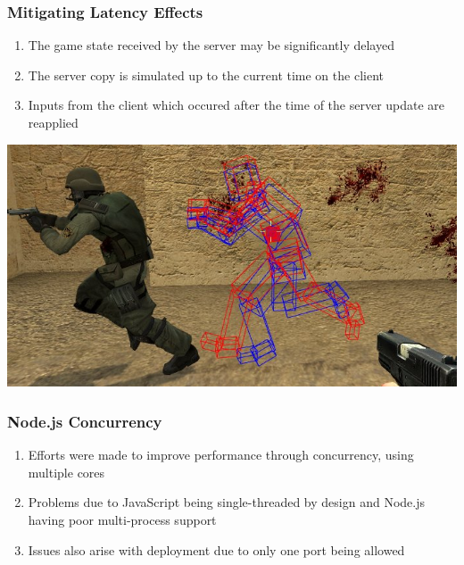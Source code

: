 \documentclass{beamer}
\begin{document}
\begin{frame}
\frametitle{Mitigating Latency Effects}
\begin{enumerate}
  \item The game state received by the server may be significantly delayed
  \item The server copy is simulated up to the current time on the client
  \item Inputs from the client which occured after the time of the server update
    are reapplied

\end{enumerate}
  \centering
  \includegraphics[scale=0.25]{images/csgo-lag-compensation.png}
\end{frame}

\begin{frame}
  \frametitle{Node.js Concurrency}
\begin{enumerate}
  \item Efforts were made to improve performance through concurrency, using
    multiple cores
  \item Problems due to JavaScript being single-threaded by design and Node.js having
    poor multi-process support
  \item Issues also arise with deployment due to only one port being allowed
\end{enumerate}
\end{frame}
\end{document}
